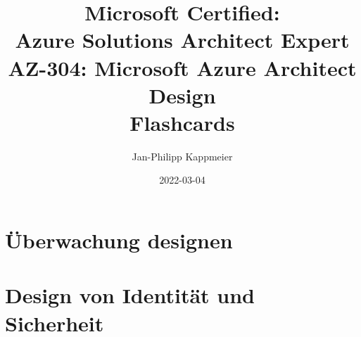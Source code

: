 \documentclass{scrartcl}
\newcommand{\sectioncard}[1]{
    \vspace*{\stretch{1}}
    \section{#1}
    \vspace*{\stretch{1}}
    \pagebreak
}
\begin{document}
    \title{Microsoft Certified:\\Azure Solutions Architect Expert\\\vspace{2mm}AZ-304: Microsoft Azure Architect Design\\Flashcards}
    \date{2022-03-04}
    \author{Jan-Philipp Kappmeier}

    \clearpage\maketitle
    \thispagestyle{empty}
    \pagebreak

    \sectioncard{Überwachung designen}

    
 
    
 
    \sectioncard{Design von Identität und Sicherheit}

    

    

    

    

    

    

    

    

    

    

    \doclicenseThis
    \pagebreak
\end{document}
